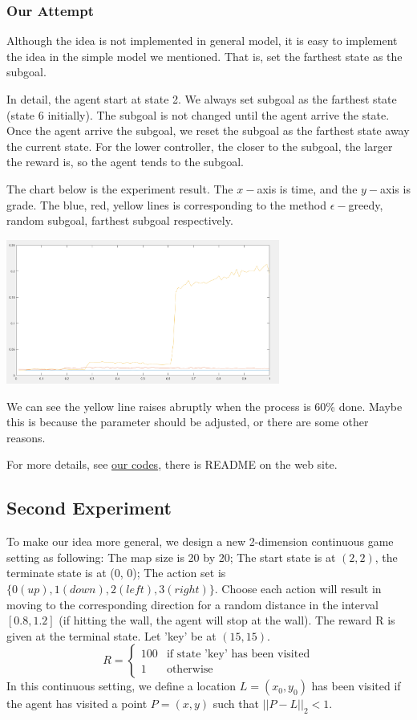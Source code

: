 \documentclass{article}
\begin{document}
\begin{spacing}{1.1}
    \subsubsection{Our Attempt}

    Although the idea is not implemented in general model, it is easy to implement the idea in the simple model we mentioned. That is, set the farthest state as the subgoal.

    In detail, the agent start at state 2. We always set subgoal as the farthest state (state 6 initially). The subgoal is not changed until the agent arrive the state. Once the agent arrive the subgoal, we reset the subgoal as the farthest state away the current state. For the lower controller, the closer to the subgoal, the larger the reward is, so the agent tends to the subgoal.

    The chart below is the experiment result. The $x-$axis is time, and the $y-$axis is grade. The blue, red, yellow lines is corresponding to the method $\epsilon-$greedy, random subgoal, farthest subgoal respectively.

    \includegraphics[width=90mm]{1.png}

    We can see the yellow line raises abruptly when the process is 60\% done. Maybe this is because the parameter should be adjusted, or there are some other reasons.
    
    For more details, see \href{https://github.com/faebdc/AI-Project}{our codes}, there is README on the web site.
 
    \subsection{Second Experiment}
    To make our idea more general, we design a new 2-dimension continuous game setting as following: The map size is 20 by 20; The start state is at $(2, 2)$, the terminate state is at (0, 0); The action set is $\{0(up), 1(down), 2(left), 3(right)\}$. Choose each action will result in moving to the corresponding direction for a random distance in the interval $[0.8, 1.2]$ (if hitting the wall, the agent will stop at the wall). The reward R is given at the terminal state. Let 'key' be at $(15, 15)$.
    $$R = \begin{cases}
        100 & \text{if state 'key' has been visited}\\
        1 & \text{otherwise}
    \end{cases}$$
    In this continuous setting, we define a location $L = (x_0, y_0)$ has been visited if the agent has visited a point $P = (x, y)$ such that $||P - L||_2 < 1$.


\end{spacing}
\end{document}
